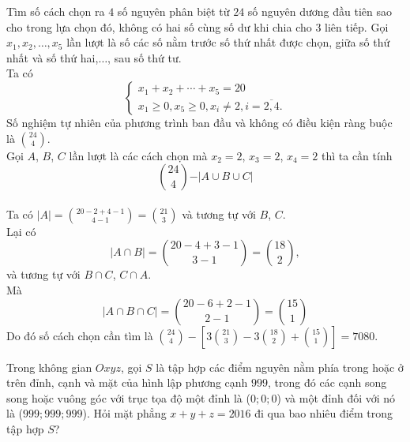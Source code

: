 \begin{bt}%
 Tìm số cách chọn ra $4$ số nguyên phân biệt từ $24$ số nguyên dương đầu tiên sao cho trong lựa chọn đó, không có hai số cùng số dư khi chia cho $3$ liên tiếp.
 \loigiai
 {
 Gọi $x_1,x_2,\ldots,x_5$ lần lượt là số các số nằm trước số thứ nhất được chọn, giữa số thứ nhất và
 số thứ hai,$\ldots$, sau số thứ tư.\\
 Ta có
 \[\begin{cases}
 x_1+x_2+\cdots +x_5=20\\
 x_1\ge 0,x_5\ge 0,x_i\neq 2,i=\overline{2,4}.
 \end{cases}\]
 Số nghiệm tự nhiên của phương trình ban đầu và không có điều kiện ràng buộc là $\displaystyle {24 \choose 4}$.\\
 Gọi $A$, $B$, $C$ lần lượt là các cách chọn mà $x_2=2$, $x_3=2$, $x_4=2$ thì ta cần tính 
 \[{24 \choose 4}-\vert A\cup B\cup C\vert\]\\
 Ta có $| A| =\displaystyle{20-2+4-1 \choose 4-1}={21 \choose 3}$ và tương tự với $B$, $C$.\\
 Lại có
 \[|A\cap B|={20-4+3-1 \choose 3-1}={18\choose 2},\]
 và tương tự với $B\cap C$, $C\cap A$.\\
 Mà 
 \[\vert A\cap B\cap C\vert={20-6+2-1\choose 2-1}={15\choose 1}\]
 Do đó số cách chọn cần tìm là $\displaystyle {24\choose 4}-\left[ 3{21 \choose 3}-3{18 \choose 2}+{15 \choose 1} \right]=7080$.
 }
\end{bt}

\begin{bt}%
 Trong không gian $Oxyz$, gọi $S$ là tập hợp các điểm nguyên nằm phía trong hoặc ở trên đỉnh, cạnh và mặt của hình lập phương cạnh $999$, trong đó các cạnh song song hoặc vuông góc với trục tọa độ một đỉnh là ($0;0;0$) và một đỉnh đối với nó là ($999;999;999$). Hỏi mặt phẳng $x + y + z = 2016$ đi qua bao nhiêu điểm trong tập hợp $S$?
\end{bt}

